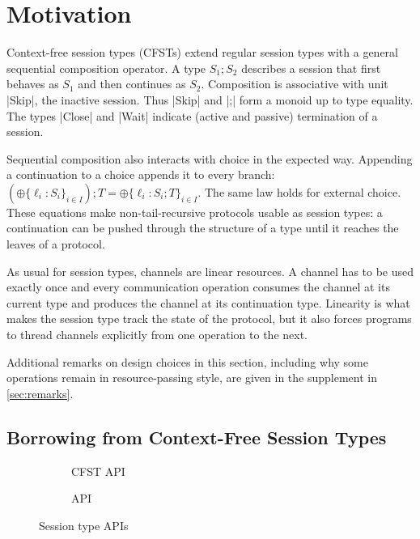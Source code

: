 
\section{Motivation}
\label{sec:motivation}

Context-free session types (CFSTs) extend regular session types with a general
sequential composition operator. A type $S_1;S_2$ describes a session that first
behaves as $S_1$ and then continues as $S_2$.  Composition is associative with
unit |Skip|, the inactive session.  Thus |Skip| and |;| form a monoid up to type
equality. The types |Close| and |Wait| indicate (active and passive) termination
of a session.

Sequential composition also interacts with choice in the expected way.
Appending a continuation to a choice appends it to every branch:
$(\oplus\{\ell_i:S_i\}_{i\in I});T =
\oplus\{\ell_i:S_i;T\}_{i\in I}$. The same law holds for external
choice. These equations make non-tail-recursive protocols
usable as session types: a continuation can be pushed through
the structure of a type until it reaches the leaves of a protocol.

As usual for session types, channels are linear resources. A channel
has to be used exactly once and every communication operation consumes
the channel at its current type and produces the channel at its
continuation type. Linearity is what makes the session type track the
state of the protocol, but it also forces programs to thread channels
explicitly from one operation to the next.

Additional remarks on design choices in this section, including why
some operations remain in resource-passing style, are given in the
supplement in \cref{sec:remarks}.

\subsection{Borrowing from Context-Free Session Types}
\label{sec:borr-from-cont}

\begin{figure}[tp]
  \TightCode
  \begin{subfigure}[t]{0.49\linewidth}
    \ApiOld
    \caption{CFST API}\label{lst:cfst-api}
  \end{subfigure}
  \begin{subfigure}[t]{0.49\linewidth}
    \ApiNew
    \caption{\thecalculus API}\label{lst:bcfst-api}
  \end{subfigure}
  \caption{Session type APIs}
  \label{fig:session-type-apis}
\end{figure}

